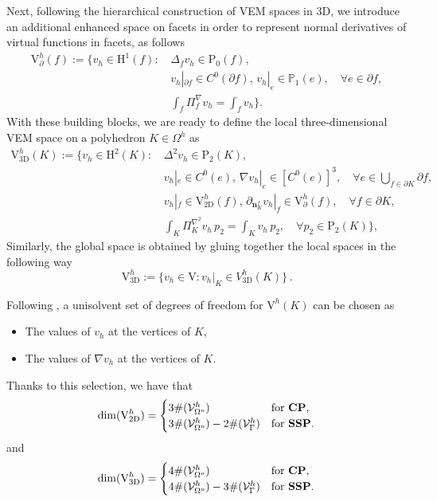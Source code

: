 \documentclass[final,reqno]{elsarticle}
\newcommand\rP{\mathrm{P}}
\def\rH{\mathrm{H}}
\def\rP{\mathrm{P}}
\def\rV{\mathrm{V}}
\begin{document}
Next, following the hierarchical construction of VEM spaces in 3D, we introduce an additional enhanced space on facets in order to represent normal derivatives of virtual functions in facets, as follows
\begin{align*}
    \rV^h_{\partial}(f):=\Big\{
    v_h\in \rH^1(f):\, &\Delta_{f} v_h \in \rP_0(f), \\
    &v_h|_{\partial{f}}\in C^0(\partial f),\, v_h|_{e}\in \mathbb{P}_1(e), \quad \forall e\in \partial f,\\
    &\int_f \Pi_{f}^{\nabla}v_h=\int_f v_h \Big\}.
\end{align*}
With these building blocks, we are ready to define the local three-dimensional VEM space on a polyhedron $K\in\Omega^h$ as
\begin{align*}
    \rV^h_{\mathrm{3D}}(K):=\Bigg\{v_h\in \rH^2(K) :\, &\Delta^2v_h\in\rP_{2}(K),\\
    &v_h|_{e}\in C^0(e),\, \nabla v_h|_{e}\in [C^0(e)]^3,\quad \forall e\in\bigcup_{f\in\partial K}\partial f,\\
    &v_h|_f\in \rV^h_{2\mathrm{D}}(f),\, \partial_{{\boldsymbol{n}}_K^f} v_h|_f\in  \rV^h_{\partial}(f),\quad  \forall f\in\partial K,\\
    &\int_K \Pi_{K}^{\nabla^2}v_h\,p_2 = \int_K  v_h\,p_2, \quad \forall p_2\in \rP_2(K)\Bigg\},
\end{align*}
Similarly, the global space is obtained by gluing together the local spaces in the following way
\begin{equation*}
\rV^h_{3\mathrm{D}}:=\Big\{v_h\in \rV: v_h|_{K}\in V^h_{3\mathrm{D}}({K})\Big\}\,.
\end{equation*}

Following \cite{ABSV2016,BDR2019C1Polyhedral}, a unisolvent set of degrees of freedom for $\rV^h(K)$ can be chosen as
\begin{itemize}
    \item The values of $v_h$ at the vertices of $K$,
    \item The values of $\nabla v_h$ at the vertices of $K$.
\end{itemize}
Thanks to this selection, we have that
\begin{align*}
\mathrm{dim}(\rV^h_{2\mathrm{D}})
=\begin{cases}
3\#(\mathcal{V}_{\Omega^o}^h)&\mbox{for {\bf CP}},\\
3\#(\mathcal{V}_{\Omega^o}^h)-2\#(\mathcal{V}_{\Gamma}^h)&\mbox{for {\bf SSP}}.
\end{cases}
\end{align*}
and
\begin{align*}
\mathrm{dim}(\rV^h_{3\mathrm{D}})
=\begin{cases}
4\#(\mathcal{V}_{\Omega^o}^h)&\mbox{for {\bf CP}},\\
4\#(\mathcal{V}_{\Omega^o}^h)-3\#(\mathcal{V}_{\Gamma}^h)&\mbox{for {\bf SSP}}.
\end{cases}
\end{align*}
\end{document}
